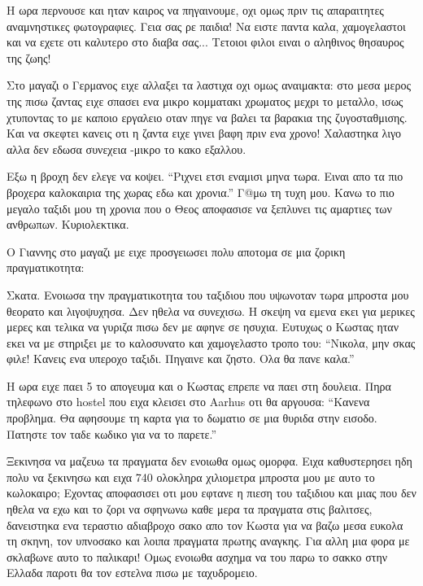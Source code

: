 Η ωρα περνουσε και ηταν καιρος να πηγαινουμε, οχι ομως πριν τις απαραιτητες αναμνηστικες φωτογραφιες. Γεια σας ρε παιδια! Να ειστε παντα καλα, χαμογελαστοι και να εχετε οτι καλυτερο στο διαβα σας... Τετοιοι φιλοι ειναι ο αληθινος θησαυρος της ζωης!


Στο μαγαζι ο Γερμανος ειχε αλλαξει τα λαστιχα οχι ομως αναιμακτα: στο μεσα μερος της πισω ζαντας ειχε σπασει ενα μικρο κομματακι χρωματος μεχρι το μεταλλο, ισως χτυποντας το με καποιο εργαλειο οταν πηγε να βαλει τα βαρακια της ζυγοσταθμισης. Και να σκεφτει κανεις οτι η ζαντα ειχε γινει βαφη πριν ενα χρονο! Χαλαστηκα λιγο αλλα δεν εδωσα συνεχεια -μικρο το κακο εξαλλου.

Εξω η βροχη δεν ελεγε να κοψει. ``Ριχνει ετσι εναμισι μηνα τωρα. Ειναι απο τα πιο βροχερα καλοκαιρια της χωρας εδω και χρονια.''
Γ@μω τη τυχη μου. Κανω το πιο μεγαλο ταξιδι μου τη χρονια που ο Θεος αποφασισε να ξεπλυνει τις αμαρτιες των ανθρωπων. Κυριολεκτικα.

Ο Γιαννης στο μαγαζι με ειχε προσγειωσει πολυ αποτομα σε μια ζορικη πραγματικοτητα:


Σκατα. Ενοιωσα την πραγματικοτητα του ταξιδιου που υψωνοταν τωρα μπροστα μου θεορατο και λιγοψυχησα. Δεν ηθελα να συνεχισω. Η σκεψη να εμενα εκει για μερικες μερες και τελικα να γυριζα πισω δεν με αφηνε σε ησυχια. Ευτυχως ο Κωστας ηταν εκει να με στηριξει με το καλοσυνατο και χαμογελαστο τροπο του: ``Νικολα, μην σκας φιλε! Κανεις ενα υπεροχο ταξιδι. Πηγαινε και ζηστο. Ολα θα πανε καλα.''

Η ωρα ειχε παει 5 το απογευμα και ο Κωστας επρεπε να παει στη δουλεια. Πηρα τηλεφωνο στο hostel που ειχα κλεισει στο Aarhus οτι θα αργουσα: ``Κανενα προβλημα. Θα αφησουμε τη καρτα για το δωματιο σε μια θυριδα στην εισοδο. Πατηστε τον ταδε κωδικο για να το παρετε.''

Ξεκινησα να μαζευω τα πραγματα δεν ενοιωθα ομως ομορφα. Ειχα καθυστερησει ηδη πολυ να ξεκινησω και ειχα 740 ολοκληρα χιλιομετρα μπροστα μου με αυτο το κωλοκαιρο; 
Εχοντας αποφασισει οτι μου εφτανε η πιεση του ταξιδιου και μιας που δεν ηθελα να εχω και το ζορι να σφηνωνω καθε μερα τα πραγματα στις βαλιτσες, δανειστηκα ενα τεραστιο αδιαβροχο σακο απο τον Κωστα για να βαζω μεσα ευκολα τη σκηνη, τον υπνοσακο και λοιπα πραγματα πρωτης αναγκης. 
Για αλλη μια φορα με σκλαβωνε αυτο το παλικαρι! Ομως ενοιωθα ασχημα να του παρω το σακκο στην Ελλαδα παροτι θα τον εστελνα πισω με ταχυδρομειο.


